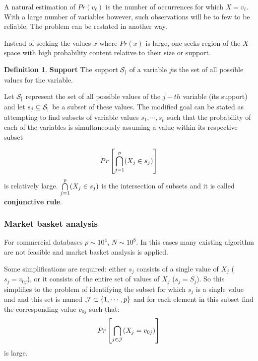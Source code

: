 \documentclass[12pt, letterpaper]{article}
\theoremstyle{definition}
\newtheorem{definition}{Definition}[section]
\DeclarePairedDelimiter\autobracket{(}{)}
\newcommand{\br}[1]{\autobracket*{#1}}
\begin{document}
A natural estimation of $Pr(v_\ell)$ is the number of occurrences for which $X=v_\ell$. With a large number of variables however, such observations will be to few to be reliable. The problem can be restated in another way.

Instead of seeking the values $x$ where $Pr(x)$ is large, one seeks region of the $X$-space with high probability content relative to their size or support.
\begin{definition}{\textbf{Support}}
The support $\CMcal{S_j}$ of a variable $j$is the set of all possible values for the variable.
\end{definition}
Let $\CMcal{S_j}$ represent the set of all possible values of the $j-th$ variable (its support) and let $ s_j \subseteq \CMcal{S_j}$ be a subset of these values. The modified goal can be stated as attempting to find subsets of variable values $s_1, \cdots, s_p$ such that the probability of each of the  variables is simultaneously assuming a value within its respective subset

\begin{equation}
Pr\left[ \bigcap\limits_{j = 1}^p \br{X_j \in s_j}\right]
\end{equation}
 is relatively large. $\bigcap\limits_{j = 1}^p \br{X_j \in s_j}$ is the intersection of subsets and it is called \textbf{conjunctive rule}.

\subsubsection{Market basket analysis}
For commercial databases $p\sim 10^4$, $N \sim 10^8$. In this cases many existing algorithm are not feasible and market basket analysis is applied.

Some simplifications are required: either $s_j$ consists of a single value of $X_j$ ($s_j = v_{0j}$), or it consists of the entire set of values of $X_j$ ($s_j = S_j$). So this simplifies to the problem of identifying the subset for which $s_j$ is a single value and and this  set is named $\CMcal{J} \subset \{1,\cdots,p\}$ and for each element in this subset find the corresponding value $v_{0j}$ such that:
\begin{equation}
Pr\left[ \bigcap\limits_{j \in \CMcal{J}} \br{X_j = v_{0j}}\right]
\label{dummyVarProb}
\end{equation}
is large.
\end{document}
